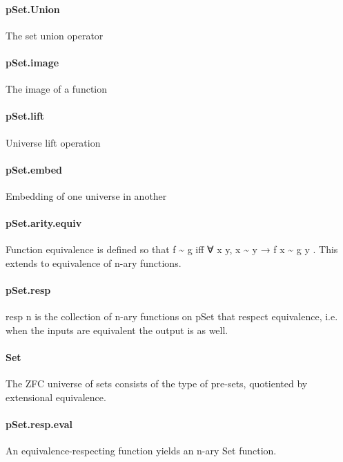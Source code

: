 \documentclass{article}
\begin{document}
\paragraph{pSet.Union}
\par
The set union operator
\paragraph{pSet.image}
\par
The image of a function
\paragraph{pSet.lift}
\par
Universe lift operation
\paragraph{pSet.embed}
\par
Embedding of one universe in another
\paragraph{pSet.arity.equiv}
\par
Function equivalence is defined so that 
\colorbox[RGB]{253,246,227}{{{{\color[RGB]{101, 123, 131} f \textasciitilde{} g }}}} iff
\colorbox[RGB]{253,246,227}{{{{\color[RGB]{101, 123, 131} ∀ x y, x \textasciitilde{} y  }}}{{{\color[RGB]{133, 153, 0} → }}}{{{\color[RGB]{101, 123, 131}  f x \textasciitilde{} g y }}}}. This extends to equivalence of n-ary
functions.
\paragraph{pSet.resp}
\par
\colorbox[RGB]{253,246,227}{{{{\color[RGB]{101, 123, 131} resp n }}}} is the collection of n-ary functions on 
\colorbox[RGB]{253,246,227}{{{{\color[RGB]{101, 123, 131} pSet }}}} that respect
equivalence, i.e. when the inputs are equivalent the output is as well.
\paragraph{Set}
\par
The ZFC universe of sets consists of the type of pre-sets,
quotiented by extensional equivalence.
\paragraph{pSet.resp.eval}
\par
An equivalence-respecting function yields an n-ary Set function.
\end{document}
